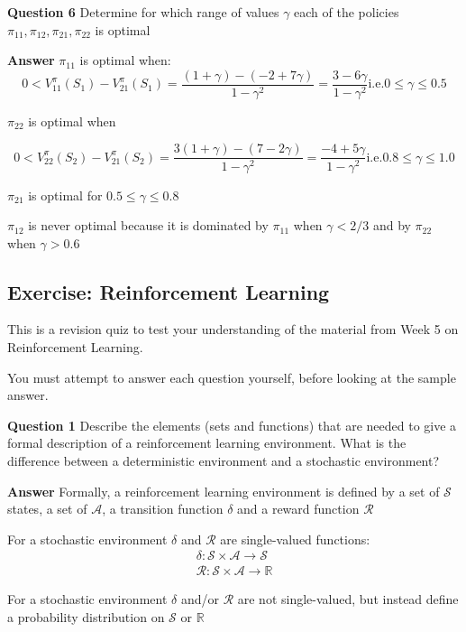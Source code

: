 \documentclass[11pt]{article}
\begin{document}
\textbf{Question 6}
Determine for which range of values $\gamma$ each of the policies
$\pi_{11}, \pi_{12}, \pi_{21}, \pi_{22}$ is optimal

\textbf{Answer}
$\pi_{11}$ is optimal when:
\[0 < V_{11}^{\pi}(S_1) - V_{21}^{\pi} (S_1) = \dfrac{(1+\gamma) - (-2 + 7\gamma)}{1 - \gamma^2} = \dfrac{3 - 6\gamma}{1 - \gamma^2} \text{i.e.} 0 \leq \gamma \leq 0.5\]

$\pi_{22}$ is optimal when

\[0 < V_{22}^{\pi}(S_2) - V_{21}^{\pi} (S_2) = \dfrac{3(1 + \gamma) - (7 - 2\gamma)}{1 - \gamma^2} = \dfrac{-4 + 5\gamma}{1 - \gamma^2} \text{i.e.} 0.8 \leq \gamma \leq 1.0\]

$\pi_{21}$ is optimal for $0.5 \leq \gamma \leq 0.8$

$\pi_{12}$ is never optimal because it is dominated by $\pi_{11}$ when $\gamma < 2/3$ and by $\pi_{22}$ when $\gamma > 0.6$

\subsection{Exercise: Reinforcement Learning}\label{subsec:exercise:-reinforcement-learning2}
This is a revision quiz to test your understanding of the material from Week 5 on Reinforcement Learning.

You must attempt to answer each question yourself, before looking at the sample answer.

\textbf{Question 1}
Describe the elements (sets and functions) that are needed to give a formal
description of a reinforcement learning environment.
What is the difference between a deterministic environment and a stochastic
environment?

\textbf{Answer}
Formally, a reinforcement learning environment is defined by a set of
$\mathcal{S}$ states, a set of $\mathcal{A}$, a transition function $\delta$
and a reward function $\mathcal{R}$

For a stochastic environment $\delta$ and $\mathcal{R}$ are single-valued functions:
\[
\begin{aligned}
    \delta : \mathcal{S} \times \mathcal{A} \to \mathcal{S} \\
    \mathcal{R}: \mathcal{S} \times \mathcal{A} \to \mathbb{R}
\end{aligned}
\]

For a stochastic environment $\delta$ and/or $\mathcal{R}$ are not
single-valued, but instead define a probability distribution on $\mathcal{S}$
or $\mathbb{R}$
\end{document}
